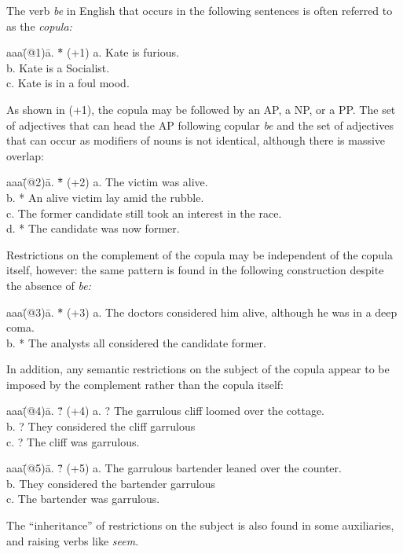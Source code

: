 \label{cop}
The verb {\em be} in English that occurs in the following sentences is
often referred to as the {\em copula:}
\begin{tabbing}
aaa\=(@1)\= a. \= *\= \kill
   \>(+1)\> a. \>  \> Kate is furious. \\
   \>   \> b. \>  \> Kate is a Socialist. \\
   \>   \> c. \>  \> Kate is in a foul mood.
\end{tabbing}
As shown in (+1), the copula may be followed by an AP, a NP, or a PP.
The set of adjectives that can head the AP following copular {\em be} and
the set of adjectives that can occur as modifiers of nouns is not
identical, although there is massive overlap:
\begin{tabbing}
aaa\=(@2)\= a. \= *\= \kill
   \>(+2)\> a. \>  \> The victim was alive. \\
   \>    \> b. \> *\> An alive victim lay amid the rubble. \\
   \>    \> c. \>  \> The former candidate still took an interest in the
                      race. \\
   \>    \> d. \> *\> The candidate was now former.
\end{tabbing}
Restrictions on the complement of the copula may be independent of the
copula itself, however: the same pattern is found in the following
construction despite the absence of {\em be:}
\begin{tabbing}
aaa\=(@3)\= a. \= *\= \kill
   \>(+3)\> a. \>  \> The doctors considered him alive, although he
                       was in a deep coma. \\
   \>    \>  b. \> *\> The analysts all considered the candidate former.
\end{tabbing}
In addition, any semantic restrictions on the subject of the copula
appear to be imposed by the complement rather than the copula itself:
\begin{tabbing}
aaa\=(@4)\= a. \= ?\= \kill
   \>(+4)\> a. \> ?\> The garrulous cliff loomed over the cottage. \\
   \>    \>  b. \> ?\> They considered the cliff garrulous \\
   \>    \>  c. \> ?\> The cliff was garrulous.
\end{tabbing}
\begin{tabbing}
aaa\=(@5)\= a. \= ?\= \kill
   \>(+5)\> a. \>  \> The garrulous bartender leaned over the counter. \\
   \>    \>  b. \>  \> They considered the bartender garrulous \\
   \>    \>  c. \>  \> The bartender was garrulous.
\end{tabbing}
The ``inheritance'' of restrictions on the subject is also found in some 
auxiliaries, and raising verbs like {\em seem\/}.

